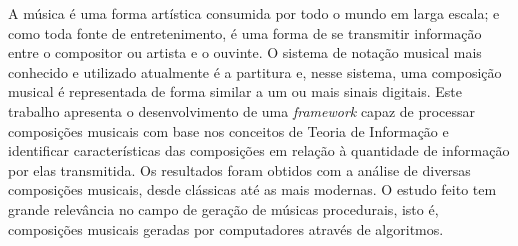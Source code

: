 A música é uma forma artística consumida por todo o mundo em larga escala; e como toda fonte de entretenimento, é uma forma de se transmitir informação entre o compositor ou artista e o ouvinte. O sistema de notação musical mais conhecido e utilizado atualmente é a partitura e, nesse sistema, uma composição musical é representada de forma similar a um ou mais sinais digitais. Este trabalho apresenta o desenvolvimento de uma \textit{framework} capaz de processar composições musicais com base nos conceitos de Teoria de Informação e identificar características das composições em relação à quantidade de informação por elas transmitida. Os resultados foram obtidos com a análise de diversas composições musicais, desde clássicas até as mais modernas. O estudo feito tem grande relevância no campo de geração de músicas procedurais, isto é, composições musicais geradas por computadores através de algoritmos.
